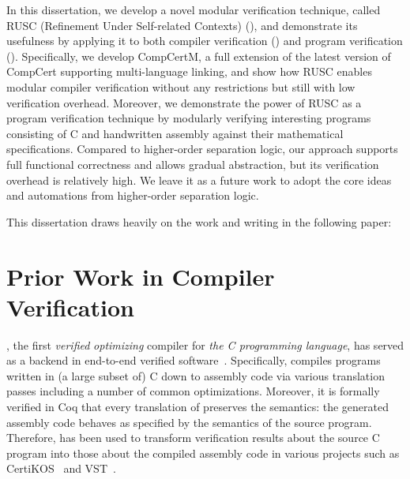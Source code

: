 In this dissertation, we develop a novel modular verification technique, called RUSC (Refinement
Under Self-related Contexts) (), and demonstrate its usefulness by applying it to
both compiler verification () and program verification ().
Specifically, we develop CompCertM, a full
extension of the latest version of CompCert supporting multi-language
linking, and show how RUSC enables modular compiler verification without any restrictions but still with low verification overhead.
Moreover, we demonstrate the power of RUSC as a program
verification technique by modularly verifying interesting programs
consisting of C and handwritten assembly against their mathematical
specifications. Compared to higher-order separation logic, our approach
supports full functional correctness and allows gradual abstraction, but its verification overhead is relatively high.
We leave it as a future work to adopt the core ideas and automations from higher-order separation logic.


This dissertation draws heavily on the work and writing in the following paper: \cite{song:compcertm}

\section{Prior Work in Compiler Verification}\label{sec:overview:compiler}
\cc{} \cite{CompCert, Compcert-CACM}, the first \emph{verified}
\emph{optimizing} compiler for \emph{the C programming language}, has
served as a backend in end-to-end verified
software~\cite{appel2014program}. Specifically, \cc{} compiles programs written in (a
large subset of) C down to assembly code via various translation
passes including a number of common optimizations.  Moreover, it is
formally verified in Coq that every translation of \cc{} preserves the
semantics: the generated assembly code behaves as specified by the
semantics of the source program. Therefore, \cc{} has been used to
transform verification results about the source C program into those
about the compiled assembly code in various projects such as
CertiKOS~\cite{CertiKOS11, CertiKOS16} and VST~\cite{VST}.

